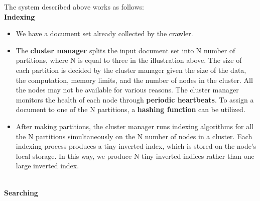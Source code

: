 The system described above works as follows:
\\
\textbf{Indexing}

\begin{itemize}
\item
\protect{}\label{5bqoRjvUtLuQz73ssCvNq}
We have a document set already collected by the crawler.
\item
\protect{}\label{1lP04anJeitp-qbh7Pi1R}
The \textbf{cluster manager} splits the input document set into N number of partitions, where N is equal to three in the illustration above. The size of each partition is decided by the cluster manager given the size of the data, the computation, memory limits, and the number of nodes in the cluster. All the nodes may not be available for various reasons. The cluster manager monitors the health of each node through \textbf{periodic heartbeats}. To assign a document to one of the N partitions, a \textbf{hashing function} can be utilized.
\item
\protect{}\label{gTlK8gVydhJQQOzrtLnKG}
After making partitions, the cluster manager runs indexing algorithms for all the N partitions simultaneously on the N number of nodes in a cluster. Each indexing process produces a tiny inverted index, which is stored on the node's local storage. In this way, we produce N tiny inverted indices rather than one large inverted index.
\end{itemize}
\\
\textbf{Searching}

